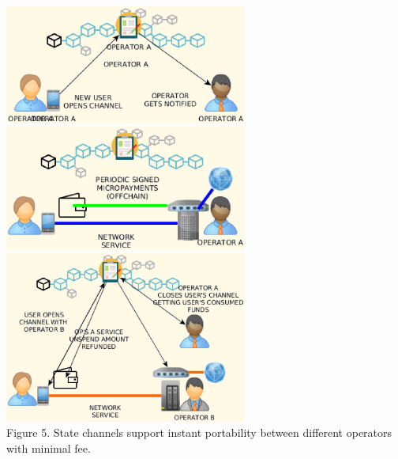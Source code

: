 \documentclass[12pt]{amsart}
\begin{document}
\begin{multicols}{2}


\end{multicols}
\begin{center}
  \includegraphics[keepaspectratio, width=0.6\textwidth]{images/bc5g/sc1-y.eps}
  \includegraphics[keepaspectratio, width=0.6\textwidth]{images/bc5g/sc2-y.eps}
  \includegraphics[keepaspectratio, width=0.6\textwidth]{images/bc5g/sc3-y.eps}
\\
Figure 5. State channels support instant portability
between different operators with minimal fee.
\\
\end{center}
\begin{multicols}{2}


\end{multicols}
\end{document}
